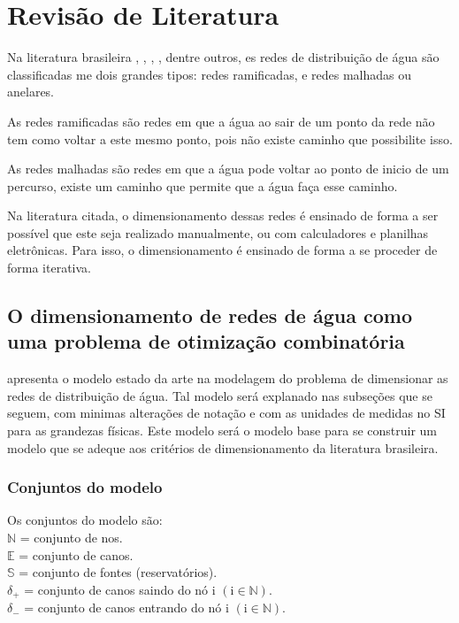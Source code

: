 \documentclass[
	12pt,				%
	openright,			%
	twoside,			%
	a4paper,			%
	english,			%
	french,				%
	spanish,			%
	brazil				%
	]{abntex2}
\newcommand{\setN}{\mathbb{N}}
\newcommand{\setE}{\mathbb{E}}
\newcommand{\setS}{\mathbb{S}}
\begin{document}
\newpage

\chapter{Revisão de Literatura}\label{revisao_de_literatura}


Na literatura brasileira , , , , dentre outros, es redes de distribuição de água são classificadas me dois grandes tipos: redes ramificadas, e redes malhadas ou anelares.

As redes ramificadas são redes em que a água ao sair de um ponto da rede não tem como voltar a este mesmo ponto, pois não existe caminho que possibilite isso. 

As redes malhadas são redes em que a água pode voltar ao ponto de inicio de um percurso, existe um caminho que permite que a água faça esse caminho. 

Na literatura citada, o dimensionamento dessas redes é ensinado de forma a ser possível que este seja realizado manualmente, ou com calculadores e planilhas eletrônicas. Para isso, o dimensionamento é ensinado de forma a se proceder de forma iterativa.




\section{O dimensionamento de redes de água como uma problema de otimização combinatória}

 apresenta o modelo estado da arte na modelagem do problema de dimensionar as redes de distribuição de água. Tal modelo será explanado nas subseções que se seguem, com minimas alterações de notação e com as unidades de medidas no SI para as grandezas físicas. Este modelo será o modelo base para se construir um modelo que se adeque aos critérios de dimensionamento da literatura brasileira.

\subsection{Conjuntos do modelo}
Os conjuntos do modelo são: \\
\noindent
$\setN$ = conjunto de nos. \\
$\setE$ = conjunto de canos. \\
$\setS$ = conjunto de fontes (reservatórios). \\
$\delta_{+}$ = conjunto de canos saindo do nó $\mathrm{i}$ $\left( \mathrm{i} \in \mathbb{N} \right)$. \\
$\delta_{-}$ = conjunto de canos entrando do nó $\mathrm{i}$ $\left( \mathrm{i} \in \mathbb{N} \right)$. \\
\end{document}
